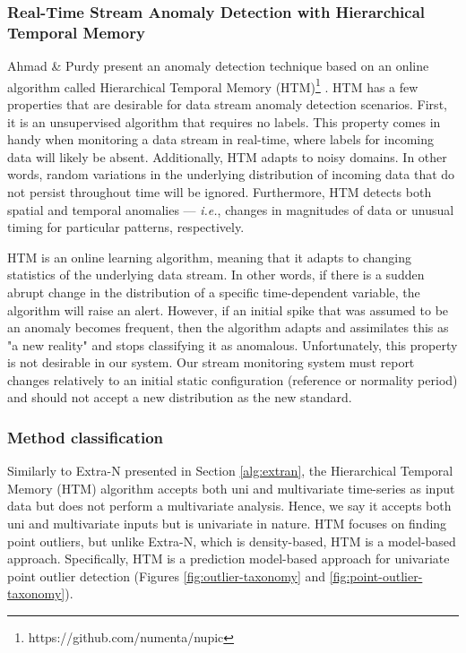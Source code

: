 \subsubsection{Real-Time Stream Anomaly Detection with Hierarchical Temporal Memory}
Ahmad \& Purdy present an anomaly detection technique based on an online algorithm called Hierarchical Temporal Memory (HTM)\footnote{https://github.com/numenta/nupic} \cite{Ahmad-HTM}. HTM has a few properties that are desirable for data stream anomaly detection scenarios. First, it is an unsupervised algorithm that requires no labels. This property comes in handy when monitoring a data stream in real-time, where labels for incoming data will likely be absent. Additionally, HTM adapts to noisy domains. In other words, random variations in the underlying distribution of incoming data that do not persist throughout time will be ignored. Furthermore, HTM detects both spatial and temporal anomalies --- \textit{i.e.}, changes in magnitudes of data or unusual timing for particular patterns, respectively.   

HTM is an online learning algorithm, meaning that it adapts to changing statistics of the underlying data stream. In other words, if there is a sudden abrupt change in the distribution of a specific time-dependent variable, the algorithm will raise an alert. However, if an initial spike that was assumed to be an anomaly becomes frequent, then the algorithm adapts and assimilates this as "a new reality" and stops classifying it as anomalous. Unfortunately, this property is not desirable in our system. Our stream monitoring system must report changes relatively to an initial static configuration (reference or normality period) and should not accept a new distribution as the new standard.

\subsubsection*{Method classification}
Similarly to Extra-N presented in Section \ref{alg:extran}, the Hierarchical Temporal Memory (HTM) algorithm accepts both uni and multivariate time-series as input data but does not perform a multivariate analysis. Hence, we say it accepts both uni and multivariate inputs but is univariate in nature. HTM focuses on finding point outliers, but unlike Extra-N, which is density-based, HTM is a model-based approach. Specifically, HTM is a prediction model-based approach for univariate point outlier detection (Figures \ref{fig:outlier-taxonomy} and \ref{fig:point-outlier-taxonomy}).


